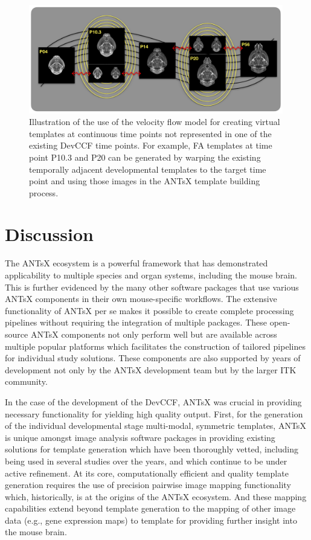 \documentclass[
  12pt,
]{article}
\begin{document}
\begin{figure}[!htb]
\centering
\includegraphics[width=0.99\textwidth]{Figures/pseudo_template.pdf}
\caption{Illustration of the use of the velocity flow model for creating virtual templates
at continuous time points not represented in one of the existing DevCCF time points.
For example, FA templates at time point P10.3 and P20 can be generated by warping the 
existing temporally adjacent developmental templates to the target time point and using 
those images in the ANTsX template building process.}
\label{fig:virtual}
\end{figure}

\clearpage
\newpage

\hypertarget{discussion}{%
\section*{Discussion}\label{discussion}}

The ANTsX ecosystem is a powerful framework that has demonstrated
applicability to multiple species and organ systems, including the mouse
brain. This is further evidenced by the many other software packages
that use various ANTsX components in their own mouse-specific workflows.
The extensive functionality of ANTsX per se makes it possible to create
complete processing pipelines without requiring the integration of
multiple packages. These open-source ANTsX components not only perform
well but are available across multiple popular platforms which
facilitates the construction of tailored pipelines for individual study
solutions. These components are also supported by years of development
not only by the ANTsX development team but by the larger ITK community.

In the case of the development of the DevCCF, ANTsX was crucial in
providing necessary functionality for yielding high quality output.
First, for the generation of the individual developmental stage
multi-modal, symmetric templates, ANTsX is unique amongst image analysis
software packages in providing existing solutions for template
generation which have been thoroughly vetted, including being used in
several studies over the years, and which continue to be under active
refinement. At its core, computationally efficient and quality template
generation requires the use of precision pairwise image mapping
functionality which, historically, is at the origins of the ANTsX
ecosystem. And these mapping capabilities extend beyond template
generation to the mapping of other image data (e.g., gene expression
maps) to template for providing further insight into the mouse brain.
\end{document}
